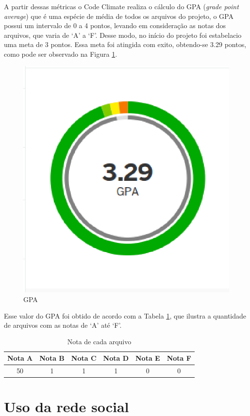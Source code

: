 \newpage

A partir dessas métricas o Code Climate realiza o cálculo do GPA (\textit{grade point average}) que é uma espécie de média de todos os arquivos do projeto, o GPA possui um intervalo de 0 a 4 pontos, levando em consideração as notas dos arquivos, que varia de `A' a `F'. Desse modo, no início do projeto foi estabelacio uma meta de 3 pontos. Essa meta foi atingida com exito, obtendo-se 3.29 pontos, como pode ser observado na Figura \ref{GPA}.

\begin{figure}[!h]
	\centering
	\includegraphics[scale=0.5]{figuras/capitulo7/gpa.eps}
	\caption[GPA]{GPA}
	\label{GPA}
\end{figure}

Esse valor do GPA foi obtido de acordo com a Tabela \ref{gpa_arquivos}, que ilustra a quantidade de arquivos com as notas de `A' até `F'.

\begin{table}[!h]
\centering
\caption{Nota de cada arquivo}
\label{gpa_arquivos}
\begin{tabular}{cccccc}
\toprule
\textbf{Nota A} & \textbf{Nota B} & \textbf{Nota C} & \textbf{Nota D} & \textbf{Nota E} & \textbf{Nota F} \\ \midrule
50 & 1 & 1 & 1 & 0 & 0							   \\ \bottomrule
\end{tabular}
\end{table}

\section{Uso da rede social}
